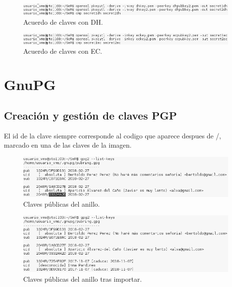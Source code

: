 \documentclass[11pt]{article}
\begin{document}
      \begin{figure}[H]
        \centering
        \includegraphics[width = \textwidth]{AcuerdoDH}
        \caption{Acuerdo de claves con DH.}
      \end{figure}

      \begin{figure}[H]
        \centering
        \includegraphics[width = \textwidth]{AcuerdoEC}
        \caption{Acuerdo de claves con EC.}
      \end{figure}

  \section{GnuPG}
    \subsection{Creación y gestión de claves PGP}
      \par
      El id de la clave siempre corresponde al codigo que aparece despues de /, marcado en una de
      las claves de la imagen.

      \begin{figure}[H]
        \centering
        \includegraphics[width = \textwidth]{sring}
        \caption{Claves públicas del anillo.}
      \end{figure}

      \begin{figure}[H]
        \centering
        \includegraphics[width = \textwidth]{nring}
        \caption{Claves públicas del anillo tras importar.}
      \end{figure}
\end{document}
